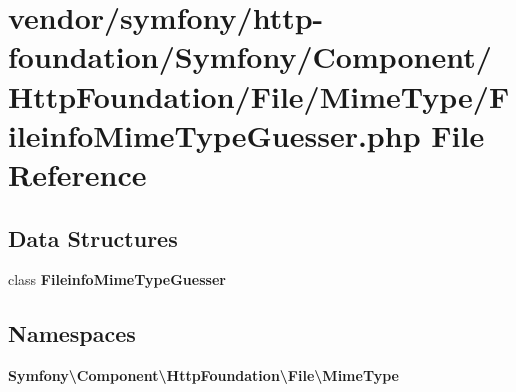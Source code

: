 \section{vendor/symfony/http-\/foundation/\+Symfony/\+Component/\+Http\+Foundation/\+File/\+Mime\+Type/\+Fileinfo\+Mime\+Type\+Guesser.php File Reference}
\label{_fileinfo_mime_type_guesser_8php}
\subsection*{Data Structures}
\begin{DoxyCompactItemize}
\item 
class {\bf Fileinfo\+Mime\+Type\+Guesser}
\end{DoxyCompactItemize}
\subsection*{Namespaces}
\begin{DoxyCompactItemize}
\item 
 {\bf Symfony\textbackslash{}\+Component\textbackslash{}\+Http\+Foundation\textbackslash{}\+File\textbackslash{}\+Mime\+Type}
\end{DoxyCompactItemize}
